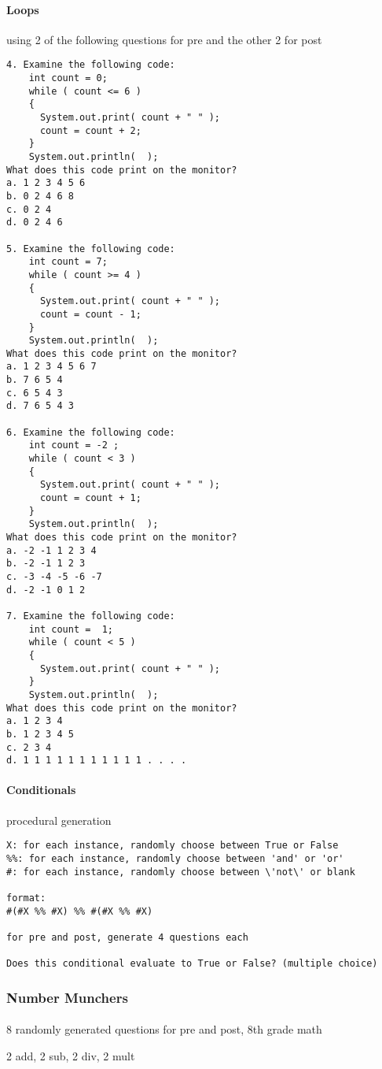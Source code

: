 		\paragraph{Loops} using 2 of the following questions for pre and the other 2 for post
\begin{lstlisting}
4. Examine the following code:
    int count = 0;                                  
    while ( count <= 6 )  
    {
      System.out.print( count + " " );
      count = count + 2; 
    }
    System.out.println(  );
What does this code print on the monitor?
a. 1 2 3 4 5 6
b. 0 2 4 6 8
c. 0 2 4
d. 0 2 4 6

5. Examine the following code:
    int count = 7;                                  
    while ( count >= 4 )  
    {
      System.out.print( count + " " );
      count = count - 1; 
    }
    System.out.println(  );
What does this code print on the monitor?
a. 1 2 3 4 5 6 7
b. 7 6 5 4
c. 6 5 4 3
d. 7 6 5 4 3

6. Examine the following code:
    int count = -2 ;                                  
    while ( count < 3 )  
    {
      System.out.print( count + " " );
      count = count + 1; 
    }
    System.out.println(  );
What does this code print on the monitor?
a. -2 -1 1 2 3 4
b. -2 -1 1 2 3
c. -3 -4 -5 -6 -7
d. -2 -1 0 1 2

7. Examine the following code:
    int count =  1;                                  
    while ( count < 5 )  
    {
      System.out.print( count + " " );
    }
    System.out.println(  );
What does this code print on the monitor?
a. 1 2 3 4
b. 1 2 3 4 5
c. 2 3 4
d. 1 1 1 1 1 1 1 1 1 1 1 . . . .

\end{lstlisting}


		\paragraph{Conditionals} procedural generation

\begin{lstlisting}
X: for each instance, randomly choose between True or False
%%: for each instance, randomly choose between 'and' or 'or'
#: for each instance, randomly choose between \'not\' or blank

format:
#(#X %% #X) %% #(#X %% #X)

for pre and post, generate 4 questions each

Does this conditional evaluate to True or False? (multiple choice)

\end{lstlisting}

	\subsubsection{Number Munchers}
	\paragraph{} 8 randomly generated questions for pre and post, 8th grade math

2 add, 2 sub, 2 div, 2 mult

